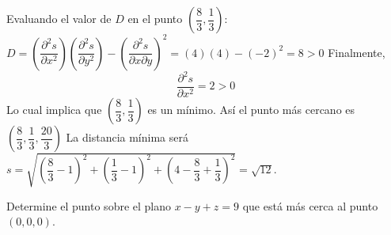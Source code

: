 \begin{prob}
\begin{myproof}
Evaluando el valor de $D$ en el punto $\left( \dfrac{8}{3},\dfrac{1}{3}  \right)$:
$D=\left(\dfrac{\partial^2 s}{\partial x^2}\right)\left(\dfrac{\partial^2 s}{\partial y^2}\right)-\left(\dfrac{\partial^2 s}{\partial x\partial y}\right)^2=\left(  4  \right)\left( 4 \right)-\left(-2 \right)^2 = 8>0$
Finalmente,  $$\dfrac{\partial^2 s}{\partial x^2}=2>0$$
Lo cual implica que $\left( \dfrac{8}{3},\dfrac{1}{3}  \right)$ es un mínimo. Así el punto más cercano es $\left(\dfrac{8}{3},\dfrac{1}{3},\dfrac{20}{3}\right)$
La distancia mínima será $s=\sqrt{\left(\dfrac{8}{3}-1\right)^2+\left(\dfrac{1}{3}-1\right)^2+\left(4-\dfrac{8}{3}+\dfrac{1}{3}\right)^2}=\sqrt{12}.$
\end{myproof}
\end{prob}

\begin{prob}
Determine el punto sobre el plano $x-y+z=9$ que está más cerca al punto $(0,0,0)$.
\end{prob}

